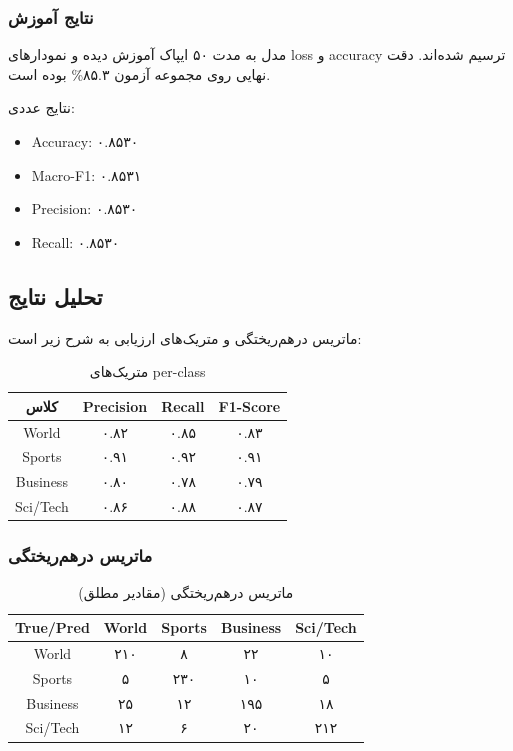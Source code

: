 \documentclass[12pt,a4paper]{article}
\begin{document}
\subsubsection{نتایج آموزش}
مدل به مدت ۵۰ ایپاک آموزش دیده و نمودارهای loss و accuracy ترسیم شده‌اند. دقت نهایی روی مجموعه آزمون ۸۵.۳\% بوده است.

نتایج عددی:
\begin{itemize}
\item Accuracy: ۰.۸۵۳۰
\item Macro-F1: ۰.۸۵۳۱
\item Precision: ۰.۸۵۳۰
\item Recall: ۰.۸۵۳۰
\end{itemize}

\subsection{تحلیل نتایج}
ماتریس درهم‌ریختگی و متریک‌های ارزیابی به شرح زیر است:

\begin{table}[H]
\centering
\begin{tabular}{|c|c|c|c|}
\hline
\textbf{کلاس} & \textbf{Precision} & \textbf{Recall} & \textbf{F1-Score} \\
\hline
World & ۰.۸۲ & ۰.۸۵ & ۰.۸۳ \\
Sports & ۰.۹۱ & ۰.۹۲ & ۰.۹۱ \\
Business & ۰.۸۰ & ۰.۷۸ & ۰.۷۹ \\
Sci/Tech & ۰.۸۶ & ۰.۸۸ & ۰.۸۷ \\
\hline
\end{tabular}
\caption{متریک‌های per-class}
\end{table}

\subsubsection{ماتریس درهم‌ریختگی}
\begin{table}[H]
\centering
\begin{tabular}{|c|c|c|c|c|}
\hline
\textbf{True/Pred} & \textbf{World} & \textbf{Sports} & \textbf{Business} & \textbf{Sci/Tech} \\
\hline
World & ۲۱۰ & ۸ & ۲۲ & ۱۰ \\
Sports & ۵ & ۲۳۰ & ۱۰ & ۵ \\
Business & ۲۵ & ۱۲ & ۱۹۵ & ۱۸ \\
Sci/Tech & ۱۲ & ۶ & ۲۰ & ۲۱۲ \\
\hline
\end{tabular}
\caption{ماتریس درهم‌ریختگی (مقادیر مطلق)}
\end{table}
\end{document}
